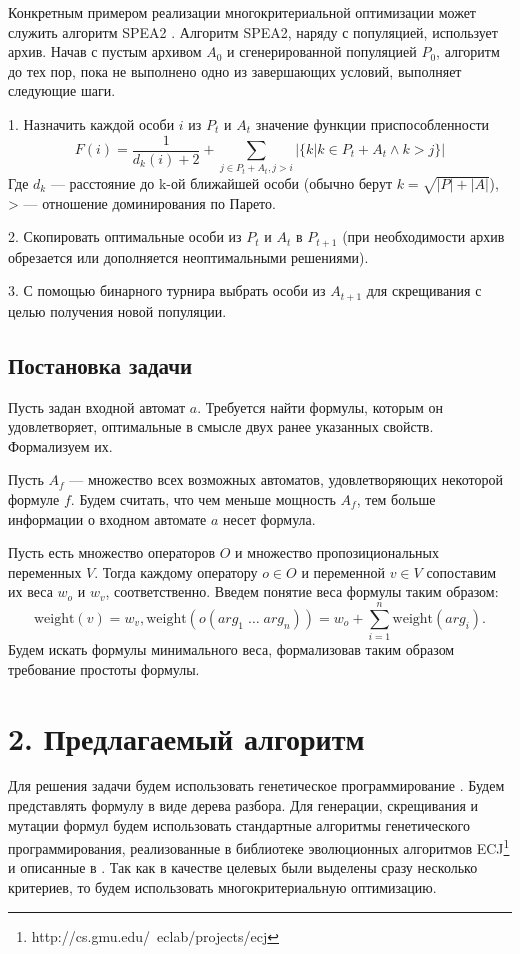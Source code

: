 \documentclass[12pt,fleqn]{article}
\begin{document}
Конкретным примером реализации многокритериальной оптимизации может служить алгоритм SPEA2 \cite{spea2}. Алгоритм SPEA2,
наряду с популяцией, использует архив. Начав с пустым архивом $A_0$ и сгенерированной популяцией $P_0$, алгоритм до
тех пор, пока не выполнено одно из завершающих условий, выполняет следующие шаги. 

1. Назначить каждой особи $i$ из $P_t$ и $A_t$ значение функции приспособленности
$$
F(i) = \frac{1}{d_k(i) + 2} + \sum_{j\in P_t + A_t, j > i}|\{k|k \in P_t + A_t \wedge k > j\}|
$$
Где $d_k$ --- расстояние до k-ой ближайшей особи (обычно берут $k = \sqrt{|P| + |A|}$), > --- отношение доминирования по Парето.

2. Скопировать оптимальные особи из $P_t$ и $A_t$ в $P_{t+1}$ (при необходимости архив обрезается или дополняется неоптимальными решениями).

3. С помощью бинарного турнира выбрать особи из $A_{t+1}$ для скрещивания с целью получения новой популяции.

\subsection{Постановка задачи}

Пусть задан входной автомат $a$. Требуется найти формулы, которым он удовлетворяет, оптимальные в смысле двух ранее указанных свойств. Формализуем их.

Пусть $A_f$ --- множество всех возможных автоматов, удовлетворяющих некоторой формуле $f$. Будем считать,
что чем меньше мощность $A_f$, тем больше информации о входном автомате $a$ несет формула.

Пусть есть множество операторов $O$ и множество пропозициональных переменных $V$.
Тогда каждому оператору $o \in O$ и переменной $v \in V$ сопоставим их веса $w_o$ и $w_v$, соответственно.
Введем понятие веса формулы таким образом:
\begin{equation*}
\text{weight}(v) = w_v, \text{weight}(o(arg_1\; \ldots \; arg_n)) = w_o + \sum_{i=1}^{n}\text{weight}(arg_i).
\end{equation*}
Будем искать формулы минимального веса, формализовав таким образом требование простоты формулы.

\section{2. Предлагаемый алгоритм}

Для решения задачи будем использовать генетическое программирование \cite{kz1}. Будем представлять формулу в виде дерева разбора.
Для генерации, скрещивания и мутации формул будем использовать стандартные алгоритмы генетического программирования,
реализованные в библиотеке эволюционных алгоритмов ECJ\footnote{http://cs.gmu.edu/~eclab/projects/ecj} и описанные в \cite{kz1, kz2}.
Так как в качестве целевых были выделены сразу несколько критериев, то будем использовать многокритериальную оптимизацию.
\end{document}
